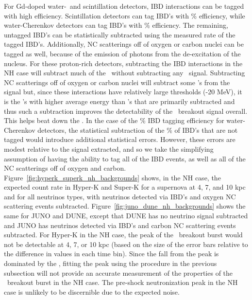For Gd-doped water-\cer\ and scintillation detectors, IBD interactions
    can be tagged with high efficiency.  Scintillation detectors can
    tag IBD's with \% 
    efficiency, while water-Cherenkov detectors can tag IBD's with
    \% efficiency.  The 
    remaining, untagged IBD's can be statistically subtracted using the measured rate of 
    the tagged IBD's.  Additionally, NC scatterings off of oxygen or carbon nuclei can be 
    tagged as well, because of the emission of photons from the de-excitation of the nucleus.  
    For these proton-rich detectors, subtracting the IBD interactions in the NH case will 
    subtract much of the \background\ without subtracting any \nue\ 
    signal.  Subtracting NC scatterings off of oxygen or carbon nuclei will subtract some 
    \nue's from the signal but, since these interactions have relatively large thresholds  
    (\abt 15-20 MeV), it is the \nux's with higher average energy than \nue's that are 
    primarily subtracted and thus such a subtraction improves the detectability of the \nue\ 
    breakout signal overall.  This helps beat down the \backgrounds.  In 
    the case of the \abt 90\% IBD tagging efficiency for water-Cherenkov detectors, the 
    statistical subtraction of the \abt 10\% of IBD's that are not tagged would introduce 
    additional statistical errors.  However, these errors are modest relative to the signal 
    extracted, and so we take the simplifying assumption of having the ability to tag all of the IBD events, as well 
    as all of the NC scatterings off of oxygen and carbon.
Figure~\ref{fig:hyperk_superk_nh_backgrounds}
shows, in the NH case, the expected count rate in Hyper-K and Super-K 
for a supernova at 4, 7, and
10 kpc and for all neutrinos types, with
neutrinos detected via IBD's and oxygen NC scattering events
subtracted.
Figure~\ref{fig:juno_dune_nh_backgrounds} shows the same for JUNO and
DUNE, except that DUNE has no neutrino signal subtracted and JUNO has
neutrinos detected via IBD's and carbon NC scattering events subtracted.
For Hyper-K in the NH case, the peak of the \nue\ breakout burst 
would not be detectable at 4, 7, or 10 kpc (based on the
size of the error bars relative to the difference in values in each
time bin).  Since 
the fall from the peak is dominated by the 
\backgrounds, fitting the
peak using the procedure in the previous subsection will not
provide an accurate measurement of the properties of the \nue\
breakout burst in the NH case.  The
pre-shock neutronization peak in the NH case is unlikely to be 
discernible due to the expected noise.  

